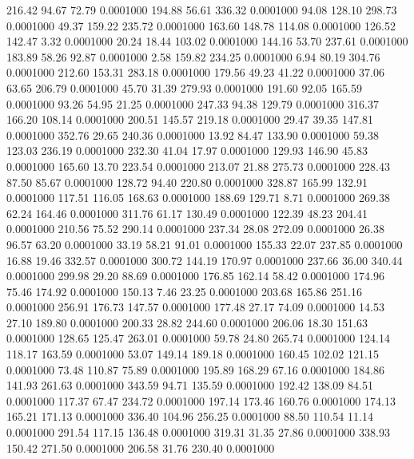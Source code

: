  216.42   94.67   72.79   0.0001000
 194.88   56.61  336.32   0.0001000
  94.08  128.10  298.73   0.0001000
  49.37  159.22  235.72   0.0001000
 163.60  148.78  114.08   0.0001000
 126.52  142.47    3.32   0.0001000
  20.24   18.44  103.02   0.0001000
 144.16   53.70  237.61   0.0001000
 183.89   58.26   92.87   0.0001000
   2.58  159.82  234.25   0.0001000
   6.94   80.19  304.76   0.0001000
 212.60  153.31  283.18   0.0001000
 179.56   49.23   41.22   0.0001000
  37.06   63.65  206.79   0.0001000
  45.70   31.39  279.93   0.0001000
 191.60   92.05  165.59   0.0001000
  93.26   54.95   21.25   0.0001000
 247.33   94.38  129.79   0.0001000
 316.37  166.20  108.14   0.0001000
 200.51  145.57  219.18   0.0001000
  29.47   39.35  147.81   0.0001000
 352.76   29.65  240.36   0.0001000
  13.92   84.47  133.90   0.0001000
  59.38  123.03  236.19   0.0001000
 232.30   41.04   17.97   0.0001000
 129.93  146.90   45.83   0.0001000
 165.60   13.70  223.54   0.0001000
 213.07   21.88  275.73   0.0001000
 228.43   87.50   85.67   0.0001000
 128.72   94.40  220.80   0.0001000
 328.87  165.99  132.91   0.0001000
 117.51  116.05  168.63   0.0001000
 188.69  129.71    8.71   0.0001000
 269.38   62.24  164.46   0.0001000
 311.76   61.17  130.49   0.0001000
 122.39   48.23  204.41   0.0001000
 210.56   75.52  290.14   0.0001000
 237.34   28.08  272.09   0.0001000
  26.38   96.57   63.20   0.0001000
  33.19   58.21   91.01   0.0001000
 155.33   22.07  237.85   0.0001000
  16.88   19.46  332.57   0.0001000
 300.72  144.19  170.97   0.0001000
 237.66   36.00  340.44   0.0001000
 299.98   29.20   88.69   0.0001000
 176.85  162.14   58.42   0.0001000
 174.96   75.46  174.92   0.0001000
 150.13    7.46   23.25   0.0001000
 203.68  165.86  251.16   0.0001000
 256.91  176.73  147.57   0.0001000
 177.48   27.17   74.09   0.0001000
  14.53   27.10  189.80   0.0001000
 200.33   28.82  244.60   0.0001000
 206.06   18.30  151.63   0.0001000
 128.65  125.47  263.01   0.0001000
  59.78   24.80  265.74   0.0001000
 124.14  118.17  163.59   0.0001000
  53.07  149.14  189.18   0.0001000
 160.45  102.02  121.15   0.0001000
  73.48  110.87   75.89   0.0001000
 195.89  168.29   67.16   0.0001000
 184.86  141.93  261.63   0.0001000
 343.59   94.71  135.59   0.0001000
 192.42  138.09   84.51   0.0001000
 117.37   67.47  234.72   0.0001000
 197.14  173.46  160.76   0.0001000
 174.13  165.21  171.13   0.0001000
 336.40  104.96  256.25   0.0001000
  88.50  110.54   11.14   0.0001000
 291.54  117.15  136.48   0.0001000
 319.31   31.35   27.86   0.0001000
 338.93  150.42  271.50   0.0001000
 206.58   31.76  230.40   0.0001000
